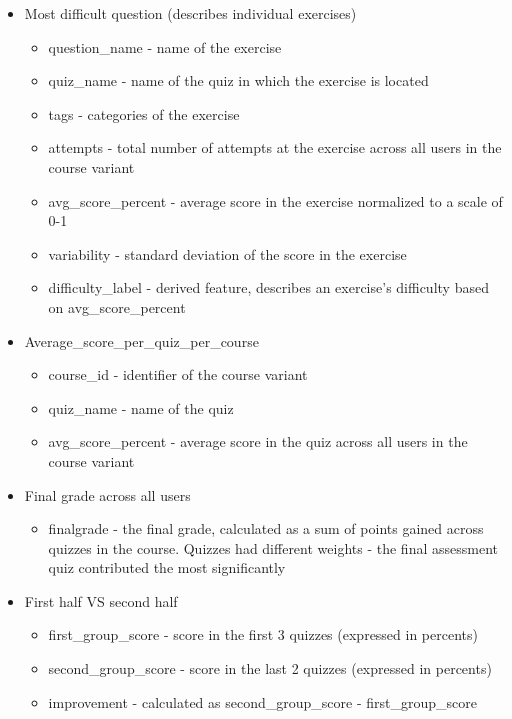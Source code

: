 \begin{itemize}
    \item Most difficult question (describes individual exercises)
        \begin{itemize}
            \item question\_name - name of the exercise
            \item quiz\_name - name of the quiz in which the exercise is located
            \item tags - categories of the exercise
            \item attempts - total number of attempts at the exercise across all users in the course variant
            \item avg\_score\_percent - average score in the exercise normalized to a scale of 0-1
            \item variability - standard deviation of the score in the exercise
            \item difficulty\_label - derived feature, describes an exercise's difficulty based on avg\_score\_percent
        \end{itemize}
    \item Average\_score\_per\_quiz\_per\_course
        \begin{itemize}
            \item course\_id - identifier of the course variant
            \item quiz\_name - name of the quiz
            \item avg\_score\_percent - average score in the quiz across all users in the course variant
        \end{itemize}
    \item Final grade across all users
        \begin{itemize}
            \item finalgrade - the final grade, calculated as a sum of points gained across quizzes in the course. Quizzes had different weights - the final assessment quiz contributed the most significantly
        \end{itemize}
    \item First half VS second half
        \begin{itemize}
            \item first\_group\_score - score in the first 3 quizzes (expressed in percents)
            \item second\_group\_score - score in the last 2 quizzes (expressed in percents)
            \item improvement - calculated as second\_group\_score - first\_group\_score

\end{itemize}
\end{itemize}

